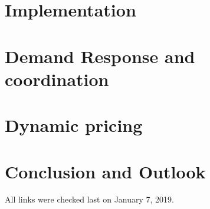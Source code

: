 \documentclass[12pt]{scrartcl}
\begin{document}
\section{Implementation}\label{sec:Implementation}


\section{Demand Response and coordination}\label{sec:DemandResponse}


\section{Dynamic pricing}\label{sec:DynamicPricing }




\section{Conclusion and Outlook}\label{sec:conclusionAndOutlook}


\printbibliography
%
%
All links were checked last on January 7, 2019.
\end{document}
